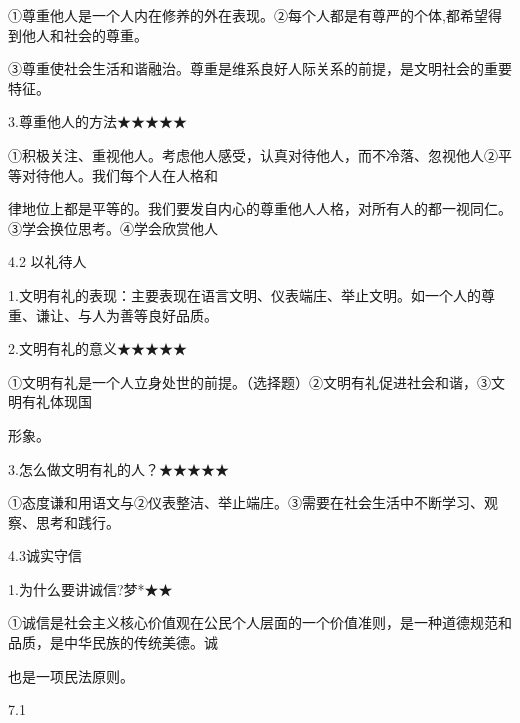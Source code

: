 \documentclass[lang=cn,11pt]{elegantbook}
\newcommand{\daofasym}[1]{{\daofasymbolfont #1}}
\newcommand{\daofasym}[1]{#1}
\begin{document}
\daofasym{①}尊重他人是一个人内在修养的外在表现。\daofasym{②}每个人都是有尊严的个体,都希望得到他人和社会的尊重。\par

\daofasym{③}尊重使社会生活和谐融治。尊重是维系良好人际关系的前提，是文明社会的重要特征。\par

3.尊重他人的方法\daofasym{★}\daofasym{★}\daofasym{★}\daofasym{★}\daofasym{★}\par

\daofasym{①}积极关注、重视他人。考虑他人感受，认真对待他人，而不冷落、忽视他人\daofasym{②}平等对待他人。我们每个人在人格和\par

律地位上都是平等的。我们要发自内心的尊重他人人格，对所有人的都一视同仁。\daofasym{③}学会换位思考。\daofasym{④}学会欣赏他人\par

4.2 以礼待人\par

1.文明有礼的表现：主要表现在语言文明、仪表端庄、举止文明。如一个人的尊重、谦让、与人为善等良好品质。\par

2.文明有礼的意义\daofasym{★}\daofasym{★}\daofasym{★}\daofasym{★}\daofasym{★}\par

\daofasym{①}文明有礼是一个人立身处世的前提。（选择题）\daofasym{②}文明有礼促进社会和谐，\daofasym{③}文明有礼体现国\par

形象。\par

3.怎么做文明有礼的人？\daofasym{★}\daofasym{★}\daofasym{★}\daofasym{★}\daofasym{★}\par

\daofasym{①}态度谦和用语文与\daofasym{②}仪表整洁、举止端庄。\daofasym{③}需要在社会生活中不断学习、观察、思考和践行。\par

4.3诚实守信\par

1.为什么要讲诚信?梦*\daofasym{★}\daofasym{★}\par

\daofasym{①}诚信是社会主义核心价值观在公民个人层面的一个价值准则，是一种道德规范和品质，是中华民族的传统美德。诚\par

也是一项民法原则。\par

7.1\par
\end{document}
